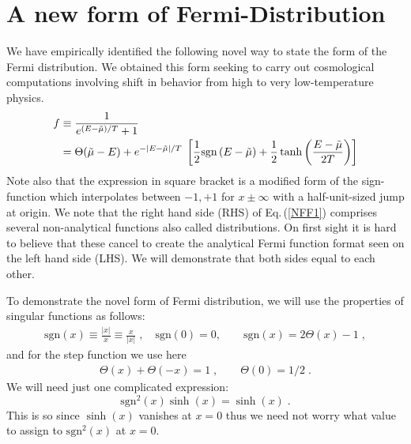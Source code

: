 \documentclass[sn-mathphys,Numbered]{sn-jnl}
\theoremstyle{thmstyleone}%
\theoremstyle{thmstyletwo}%
\theoremstyle{thmstylethree}%
\begin{document}
\section{A new form of Fermi-Distribution}\label{NewFermi}

We have empirically identified the following novel way to state the form of the Fermi distribution. We obtained this form seeking to carry out cosmological computations involving shift in behavior from high to very low-temperature physics. 
\begin{align}\label{NFF1}
f&\equiv \frac{1}{e^{ (E-\tilde\mu)/T} +1}\notag\\
&=\Theta(\tilde\mu - E) +  e^{ - |E-\tilde\mu|/T }
\; \left[\frac{1}{2}\mathrm{sgn}\left({E-\tilde\mu}\right) 
 +\frac{1}{2}\tanh\left(\frac{E-\tilde\mu}{2T}\right)\right]
\end{align}
Note also that the expression in square bracket is a modified form of the sign-function which interpolates between $-1,+1$ for $x\pm \infty$ with a half-unit-sized jump at origin.  We note  that the right hand side (RHS) of Eq.\,(\ref{NFF1}) comprises several non-analytical functions also called distributions. On first sight it is hard to believe that  these   cancel to create the analytical Fermi function format seen on the left hand side (LHS). We will demonstrate that both sides equal to each other.



To demonstrate the novel form of Fermi distribution, we will use the properties of singular functions as follows: 
\begin{align}\label{NFF2a}
\mathrm{sgn}(x)%
\equiv  \frac{|x|}{x}\equiv \frac{x}{|x|}\;,
   \quad \mathrm{sgn}(0)=0,\qquad
 \mathrm{sgn}(x)=2\Theta(x)-1\;,
 \end{align}
 and for the step function we use here
 \begin{align}
\label{NFF2c}
 \Theta(x)+\Theta(-x)=1\;,\qquad\label{NFF3}
 \Theta(0)=1/2\;.
 \end{align}
We will need just one complicated expression:
\begin{equation}\label{NFFa1}
\mathrm{sgn}^{2}(x)\sinh(x)=\sinh(x)\;.
 \end{equation}
This is so since $\sinh(x)$  vanishes  at $x=0$ thus we need not worry what value to assign to $\mathrm{sgn}^{2}(x)$ at $x=0$.  
\end{document}
